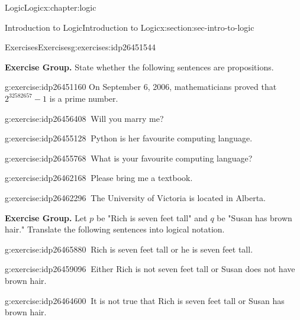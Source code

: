 \documentclass[twoside,10pt,]{book}
\numberwithin{equation}{section}
\begin{document}
\begin{chapterptx}{Logic}{}{Logic}{}{}{x:chapter:logic}
\begin{sectionptx}{Introduction to Logic}{}{Introduction to Logic}{}{}{x:section:sec-intro-to-logic}
\begin{exercises-subsection}{Exercises}{}{Exercises}{}{}{g:exercises:idp26451544}
\par\medskip\noindent%
\textbf{Exercise Group.}\space\space%
State whether the following sentences are propositions.\begin{exercisegroup}
\begin{divisionexerciseeg}{1}{}{}{g:exercise:idp26451160}%
On September 6, 2006, mathematicians proved that \(2^{32582657}-1\) is a prime number.\end{divisionexerciseeg}%
\begin{divisionexerciseeg}{2}{}{}{g:exercise:idp26456408}%
\(\ \)Will you marry me?\end{divisionexerciseeg}%
\begin{divisionexerciseeg}{3}{}{}{g:exercise:idp26455128}%
\(\ \)Python is her favourite computing language.\end{divisionexerciseeg}%
\begin{divisionexerciseeg}{4}{}{}{g:exercise:idp26455768}%
\(\ \)What is your favourite computing language?\end{divisionexerciseeg}%
\begin{divisionexerciseeg}{5}{}{}{g:exercise:idp26462168}%
\(\ \)Please bring me a textbook.\end{divisionexerciseeg}%
\begin{divisionexerciseeg}{6}{}{}{g:exercise:idp26462296}%
\(\ \)The University of Victoria is located in Alberta.\end{divisionexerciseeg}%
\end{exercisegroup}
\par\medskip\noindent
\par\medskip\noindent%
\textbf{Exercise Group.}\space\space%
Let \(p\) be "Rich is seven feet tall" and \(q\) be "Susan has brown hair." Translate the following sentences into logical notation.\begin{exercisegroup}
\begin{divisionexerciseeg}{7}{}{}{g:exercise:idp26465880}%
\(\ \)Rich is seven feet tall or he is seven feet tall.\end{divisionexerciseeg}%
\begin{divisionexerciseeg}{8}{}{}{g:exercise:idp26459096}%
\(\ \)Either Rich is not seven feet tall or Susan does not have brown hair.\end{divisionexerciseeg}%
\begin{divisionexerciseeg}{9}{}{}{g:exercise:idp26464600}%
\(\ \)It is not true that Rich is seven feet tall or Susan has brown hair.\end{divisionexerciseeg}%

\end{exercisegroup}
\end{exercises-subsection}
\end{sectionptx}
\end{chapterptx}
\end{document}
